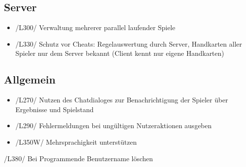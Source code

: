 \documentclass{article}
\begin{document}
\subsection{Server}
\begin{itemize}
\item /L300/ Verwaltung mehrerer parallel laufender Spiele
\item /L330/ Schutz vor Cheats: Regelauswertung durch Server, Handkarten aller Spieler nur dem Server bekannt (Client kennt nur eigene Handkarten)
\end{itemize}
	
\subsection{Allgemein}
\begin{itemize}
	\item /L270/ Nutzen des Chatdialoges zur Benachrichtigung der Spieler über Ergebnisse und Spielstand
	\item /L290/ Fehlermeldungen bei ungültigen Nutzeraktionen ausgeben
	\item /L350W/ Mehrsprachigkeit unterstützen
\end{itemize}
	\item /L380/ Bei Programmende Benutzername löschen
\end{document}
